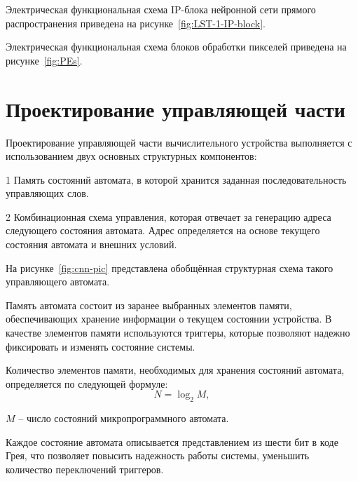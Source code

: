 Электрическая функциональная схема IP-блока нейронной сети прямого 
распространения приведена на рисунке~\ref{fig:LST-1-IP-block}.


Электрическая функциональная схема блоков обработки пикселей приведена 
на рисунке~\ref{fig:PEs}.


\section{Проектирование управляющей части}
\hspace*{12.5 mm}Проектирование управляющей части вычислительного устройства 
выполняется с использованием двух основных структурных компонентов:

1 Память состояний автомата, в которой хранится заданная последовательность 
управляющих слов. 

2 Комбинационная схема управления, которая отвечает за генерацию адреса 
следующего состояния автомата. Адрес определяется на основе текущего состояния 
автомата и внешних условий. 

На рисунке~\ref{fig:cnn-pic} представлена обобщённая структурная схема 
такого управляющего автомата. 


Память автомата состоит из заранее выбранных элементов памяти, обеспечивающих 
хранение информации о текущем состоянии устройства. В качестве элементов памяти 
используются триггеры, которые позволяют надежно фиксировать и изменять 
состояние системы.  

Количество элементов памяти, необходимых для хранения состояний автомата, 
определяется по следующей формуле:
\begin{equation}
    N = \log_{2}{M},
\end{equation}

 $M$ – число состояний микропрограммного автомата.  

Каждое состояние автомата описывается представлением из шести бит в коде Грея, 
что позволяет повысить надежность работы системы, уменьшить количество 
переключений триггеров.


